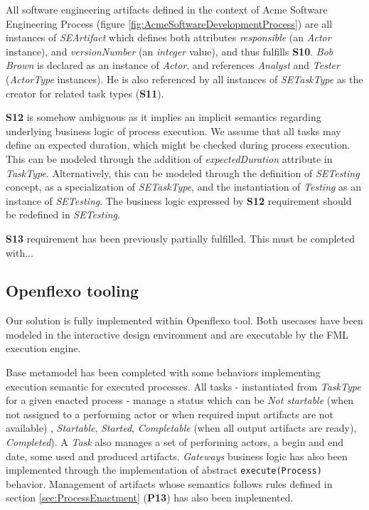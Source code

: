

All software engineering artifacts defined in the context of Acme Software Engineering Process (figure \ref{fig:AcmeSoftwareDevelopmentProcess}) are all instances of \textit{SEArtifact} which defines both attributes \textit{responsible} (an \textit{Actor} instance), and \textit{versionNumber} (an \textit{integer} value), and thus fulfills \textbf{S10}. \textit{Bob Brown} is declared as an instance of \textit{Actor}, and references \textit{Analyst} and \textit{Tester} (\textit{ActorType} instances). He is also referenced by all instances of \textit{SETaskType} as the creator for related task types (\textbf{S11}).

\textbf{S12} is somehow ambiguous as it implies an implicit semantics regarding underlying business logic of process execution. We assume that all tasks may define an expected duration, which might be checked during process execution. This can be modeled through the addition of \textit{expectedDuration} attribute in \textit{TaskType}. Alternatively, this can be modeled through the definition of \textit{SETesting} concept, as a specialization of \textit{SETaskType}, and the instantiation of \textit{Testing} as an instance of \textit{SETesting}. The business logic expressed by \textbf{S12} requirement should be redefined in \textit{SETesting}.

\textbf{S13} requirement has been previously partially fulfilled. This must be completed with...


\subsection{Openflexo tooling}
\label{subsec:tooling}

Our solution is fully implemented within Openflexo tool. Both usecases have been modeled in the interactive design environment and are executable by the FML execution engine.

Base metamodel has been completed with some behaviors implementing execution semantic for executed processes. All tasks - instantiated from \textit{TaskType} for a given enacted process - manage a status which can be \textit{Not startable} (when not assigned to a performing actor or when required input artifacts are not available) , \textit{Startable}, \textit{Started}, \textit{Completable} (when all output artifacts are ready), \textit{Completed}). A \textit{Task} also manages a set of performing actors, a begin and end date, some used and produced artifacts. \textit{Gateways} business logic has also been implemented through the implementation of abstract \texttt{execute(Process)} behavior. Management of artifacts whose semantics follows rules defined in section \ref{sec:ProcessEnactment} (\textbf{P13}) has also been implemented.

